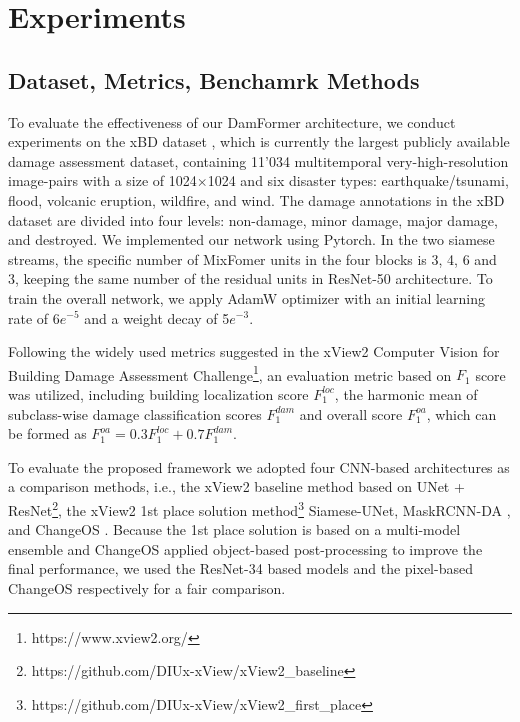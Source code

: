 \documentclass{article}
\begin{document}
\section{Experiments}
\label{sec:experiments}
\subsection{Dataset, Metrics, Benchamrk Methods}\label{sec:general}

\par To evaluate the effectiveness of our DamFormer architecture, we conduct experiments on the xBD dataset \cite{gupta2019xbd}, which is currently the largest publicly available damage assessment dataset, containing 11'034 multitemporal very-high-resolution image-pairs with a size of 1024$\times$1024 and six disaster types: earthquake/tsunami, flood, volcanic eruption, wildfire, and wind. The damage annotations in the xBD dataset are divided into four levels: non-damage, minor damage, major damage, and destroyed. 
We implemented our network using Pytorch. In the two siamese streams, the specific number of MixFomer units in the four blocks is 3, 4, 6 and 3, keeping the same number of the residual units in ResNet-50 architecture. To train the overall network, we apply AdamW optimizer with an initial learning rate of 6$e^{-5}$ and a weight decay of 5$e^{-3}$.
\par Following the widely used metrics suggested in the xView2 Computer Vision for Building Damage Assessment
Challenge\footnote{https://www.xview2.org/}, an evaluation metric based on $F_{1}$ score was utilized, including building localization score $F_{1}^{loc}$, the harmonic mean of subclass-wise damage classification scores $F_{1}^{dam}$ and overall score $F_{1}^{oa}$, which can be formed as $F_{1}^{oa}=0.3 F_{1}^{loc}+0.7F_{1}^{dam}$. 
\par To evaluate the proposed framework we adopted four CNN-based architectures as a comparison methods, i.e., the  xView2 baseline method based on UNet + ResNet\footnote{https://github.com/DIUx-xView/xView2\_baseline}, the xView2 1st place solution method\footnote{https://github.com/DIUx-xView/xView2\_first\_place} Siamese-UNet, MaskRCNN-DA \cite{weber2020building}, and ChangeOS \cite{ZHENG2021112636}. Because the 1st place solution is based on a multi-model ensemble and ChangeOS applied object-based post-processing to improve the final performance, we used the ResNet-34 based models and the pixel-based ChangeOS respectively for a fair comparison.
\end{document}
